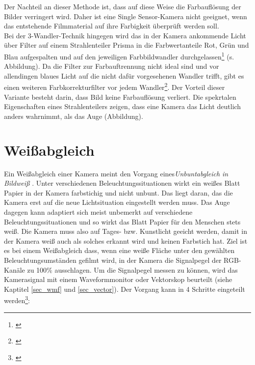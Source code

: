 Der Nachteil an dieser Methode ist, dass auf diese Weise die Farbauflösung der Bilder verringert wird. Daher ist eine \glqq Single Sensor\grqq -Kamera nicht geeignet, wenn das entstehende Filmmaterial auf ihre Farbigkeit überprüft werden soll.\\
Bei der 3-Wandler-Technik hingegen wird das in der Kamera ankommende Licht über Filter auf einem Strahlenteiler Prisma in die Farbwertanteile Rot, Grün und Blau aufgespalten und auf den jeweiligen Farbbildwandler durchgelassen\footnote{\cite[378]{schmidt}} (s. Abbildung). 
Da die Filter zur Farbauftrennung nicht ideal sind und vor allendingen blaues Licht auf die nicht dafür vorgesehenen Wandler trifft, gibt es einen weiteren Farbkorrekturfilter vor jedem Wandler\footnote{\cite[379]{schmidt}}. Der Vorteil dieser Variante besteht darin, dass Bild keine Farbauflösung verliert. Die spekrtalen Eigenschaften eines Strahlenteilers zeigen, dass eine Kamera das Licht deutlich anders wahrnimmt, als das Auge (Abbildung).



\section{Weißabgleich}
\label{sec_wb}
Ein Weißabgleich einer Kamera meint den Vorgang eines\emph{\glqq Unbuntabgleich in Bildweiß\grqq} \citep[414]{schmidt}. Unter verschiedenen Beleuchtungssituationen wirkt ein weißes Blatt Papier in der Kamera farbstichig und nicht unbunt. Das liegt daran, das die Kamera erst auf die neue Lichtsituation eingestellt werden muss. Das Auge dagegen kann adaptiert sich meist unbemerkt auf verschiedene Beleuchtungssituationen und so wirkt das Blatt Papier für den Menschen stets weiß. Die Kamera muss also auf Tages- bzw. Kunstlicht geeicht werden, damit in der Kamera weiß auch als solches erkannt wird und keinen Farbstich hat. Ziel ist es bei einem Weißabgleich dass, wenn eine weiße Fläche unter den gewählten Beleuchtungsumständen gefilmt wird, in der Kamera die Signalpegel der RGB-Kanäle zu 100\% ausschlagen. Um die Signalpegel messen zu können, wird das Kamerasignal mit einem Waveformmonitor oder Vektorskop beurteilt (siehe Kaptitel \ref{sec_wmf} und \ref{sec_vector}). Der Vorgang kann in 4 Schritte eingeteilt werden\footnote{\cite[206]{heinen}}:

